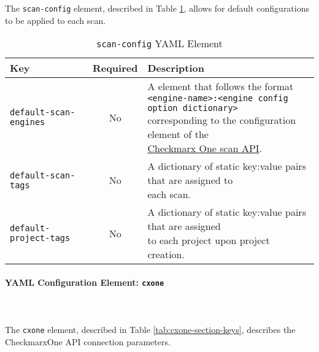\noindent\\\\The \texttt{scan-config} element, described in Table \ref{tab:scan-config-section-keys}, allows for default configurations to be applied to each scan.

\begin{table}[ht]
    \caption{\texttt{scan-config} YAML Element}  
    \label{tab:scan-config-section-keys}      
    \begin{tabularx}{\textwidth}{lcl}
        \toprule
        \textbf{Key} & \textbf{Required} & \textbf{Description}\\
        \midrule
        \texttt{default-scan-engines} & No & \makecell[l]{A element that follows the format\\\texttt{<engine-name>:<engine config option dictionary>}\\corresponding to the configuration element of the\\\href{https://checkmarx.stoplight.io/docs/checkmarx-one-api-reference-guide/branches/main/f601dd9456e80-run-a-scan}{Checkmarx One scan API}.}\\
        \midrule
        \texttt{default-scan-tags} & No &  \makecell[l]{A dictionary of static key:value pairs that are assigned to\\each scan.}\\
        \midrule
        \texttt{default-project-tags} & No & \makecell[l]{A dictionary of static key:value pairs that are assigned\\to each project upon project creation.}\\
        \bottomrule
    \end{tabularx}
\end{table}


\paragraph{YAML Configuration Element: \texttt{cxone} }\label{sec:cxone-element}

\noindent\\\\The \texttt{cxone} element, described in Table \ref{tab:cxone-section-keys}, 
describes the CheckmarxOne API connection parameters.


